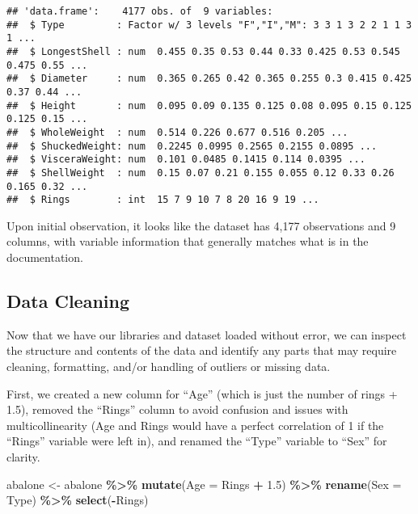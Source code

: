 \documentclass[
]{article}
\newenvironment{Shaded}{\begin{snugshade}}{\end{snugshade}}
\newcommand{\AttributeTok}[1]{\textcolor[rgb]{0.13,0.29,0.53}{#1}}
\newcommand{\FloatTok}[1]{\textcolor[rgb]{0.00,0.00,0.81}{#1}}
\newcommand{\FunctionTok}[1]{\textcolor[rgb]{0.13,0.29,0.53}{\textbf{#1}}}
\newcommand{\NormalTok}[1]{#1}
\newcommand{\OtherTok}[1]{\textcolor[rgb]{0.56,0.35,0.01}{#1}}
\newcommand{\SpecialCharTok}[1]{\textcolor[rgb]{0.81,0.36,0.00}{\textbf{#1}}}
\begin{document}
\begin{verbatim}
## 'data.frame':    4177 obs. of  9 variables:
##  $ Type         : Factor w/ 3 levels "F","I","M": 3 3 1 3 2 2 1 1 3 1 ...
##  $ LongestShell : num  0.455 0.35 0.53 0.44 0.33 0.425 0.53 0.545 0.475 0.55 ...
##  $ Diameter     : num  0.365 0.265 0.42 0.365 0.255 0.3 0.415 0.425 0.37 0.44 ...
##  $ Height       : num  0.095 0.09 0.135 0.125 0.08 0.095 0.15 0.125 0.125 0.15 ...
##  $ WholeWeight  : num  0.514 0.226 0.677 0.516 0.205 ...
##  $ ShuckedWeight: num  0.2245 0.0995 0.2565 0.2155 0.0895 ...
##  $ VisceraWeight: num  0.101 0.0485 0.1415 0.114 0.0395 ...
##  $ ShellWeight  : num  0.15 0.07 0.21 0.155 0.055 0.12 0.33 0.26 0.165 0.32 ...
##  $ Rings        : int  15 7 9 10 7 8 20 16 9 19 ...
\end{verbatim}

Upon initial observation, it looks like the dataset has 4,177
observations and 9 columns, with variable information that generally
matches what is in the documentation.

\hypertarget{data-cleaning}{%
\subsection{Data Cleaning}\label{data-cleaning}}

Now that we have our libraries and dataset loaded without error, we can
inspect the structure and contents of the data and identify any parts
that may require cleaning, formatting, and/or handling of outliers or
missing data.

First, we created a new column for ``Age'' (which is just the number of
rings + 1.5), removed the ``Rings'' column to avoid confusion and issues
with multicollinearity (Age and Rings would have a perfect correlation
of 1 if the ``Rings'' variable were left in), and renamed the ``Type''
variable to ``Sex'' for clarity.

\begin{Shaded}
\begin{Highlighting}[]
\NormalTok{abalone }\OtherTok{\textless{}{-}}\NormalTok{ abalone }\SpecialCharTok{\%\textgreater{}\%} \FunctionTok{mutate}\NormalTok{(}\AttributeTok{Age =}\NormalTok{ Rings }\SpecialCharTok{+} \FloatTok{1.5}\NormalTok{) }\SpecialCharTok{\%\textgreater{}\%} \FunctionTok{rename}\NormalTok{(}\AttributeTok{Sex =}\NormalTok{ Type) }\SpecialCharTok{\%\textgreater{}\%} \FunctionTok{select}\NormalTok{(}\SpecialCharTok{{-}}\NormalTok{Rings)}
\end{Highlighting}
\end{Shaded}
\end{document}
